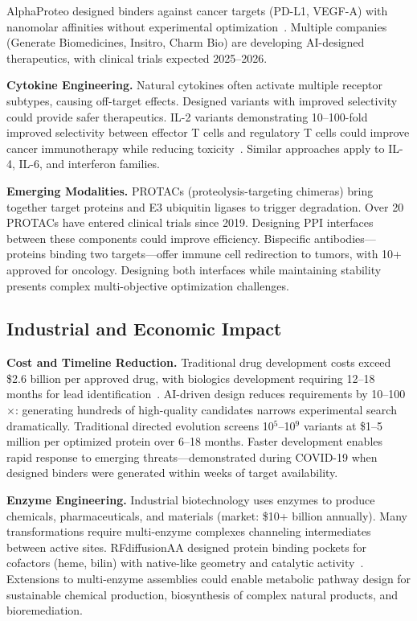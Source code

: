 AlphaProteo designed binders against cancer targets (PD-L1, VEGF-A) with nanomolar affinities without experimental optimization~\cite{zambaldi2024alphaproteo}. Multiple companies (Generate Biomedicines, Insitro, Charm Bio) are developing AI-designed therapeutics, with clinical trials expected 2025--2026.

\textbf{Cytokine Engineering.} Natural cytokines often activate multiple receptor subtypes, causing off-target effects. Designed variants with improved selectivity could provide safer therapeutics. IL-2 variants demonstrating 10--100-fold improved selectivity between effector T cells and regulatory T cells could improve cancer immunotherapy while reducing toxicity~\cite{fleming2021computational,silva2020il2}. Similar approaches apply to IL-4, IL-6, and interferon families.

\textbf{Emerging Modalities.} PROTACs (proteolysis-targeting chimeras) bring together target proteins and E3 ubiquitin ligases to trigger degradation. Over 20 PROTACs have entered clinical trials since 2019. Designing PPI interfaces between these components could improve efficiency. Bispecific antibodies---proteins binding two targets---offer immune cell redirection to tumors, with 10+ approved for oncology. Designing both interfaces while maintaining stability presents complex multi-objective optimization challenges.

\subsection{Industrial and Economic Impact}

\textbf{Cost and Timeline Reduction.} Traditional drug development costs exceed \$2.6 billion per approved drug, with biologics development requiring 12--18 months for lead identification~\cite{wouters2020cost}. AI-driven design reduces requirements by 10--100$\times$: generating hundreds of high-quality candidates narrows experimental search dramatically. Traditional directed evolution screens 10$^5$--10$^9$ variants at \$1--5 million per optimized protein over 6--18 months. Faster development enables rapid response to emerging threats---demonstrated during COVID-19 when designed binders were generated within weeks of target availability.

\textbf{Enzyme Engineering.} Industrial biotechnology uses enzymes to produce chemicals, pharmaceuticals, and materials (market: \$10+ billion annually). Many transformations require multi-enzyme complexes channeling intermediates between active sites. RFdiffusionAA designed protein binding pockets for cofactors (heme, bilin) with native-like geometry and catalytic activity~\cite{krishna2024rfaa}. Extensions to multi-enzyme assemblies could enable metabolic pathway design for sustainable chemical production, biosynthesis of complex natural products, and bioremediation.

